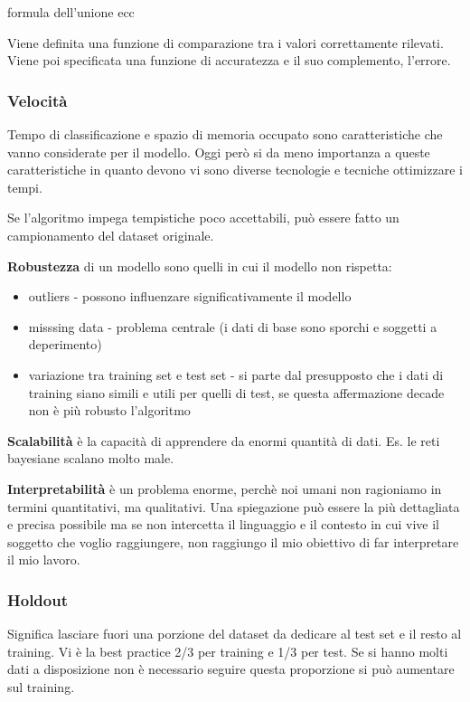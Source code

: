 formula dell'unione ecc

Viene definita una funzione di comparazione tra i valori correttamente rilevati. Viene poi specificata una funzione di accuratezza e il suo complemento, l'errore.

\subsubsection{Velocit\`a}
Tempo di classificazione e spazio di memoria occupato sono caratteristiche che vanno considerate per il modello. Oggi per\`o si da meno importanza a queste caratteristiche in quanto devono vi sono diverse tecnologie e tecniche ottimizzare i tempi.

Se l'algoritmo impega tempistiche poco accettabili, pu\`o essere fatto un campionamento del dataset originale. 

\textbf{Robustezza} di un modello sono quelli in cui il modello non rispetta:
\begin{itemize}
	\item outliers - possono influenzare significativamente il modello
	\item misssing data - problema centrale (i dati di base sono sporchi e soggetti a deperimento)
	\item variazione tra training set e test set - si parte dal presupposto che i dati di training siano simili e utili per quelli di test, se questa affermazione decade non \`e pi\`u robusto l'algoritmo
\end{itemize}

\textbf{Scalabilit\`a} \`e la capacit\`a di apprendere da enormi quantit\`a di dati. Es. le reti bayesiane scalano molto male. 

\textbf{Interpretabilit\`a} \`e un problema enorme, perch\`e noi umani non ragioniamo in termini quantitativi, ma qualitativi. Una spiegazione pu\`o essere la pi\`u dettagliata e precisa possibile ma se non intercetta il linguaggio e il contesto in cui vive il soggetto che voglio raggiungere, non raggiungo il mio obiettivo di far interpretare il mio lavoro.

\subsubsection{Holdout}
Significa lasciare fuori una porzione del dataset da dedicare al test set e il resto al training. Vi \`e la best practice 2/3 per training e 1/3 per test. Se si hanno molti dati a disposizione non \`e necessario seguire questa proporzione si pu\`o aumentare sul training.

